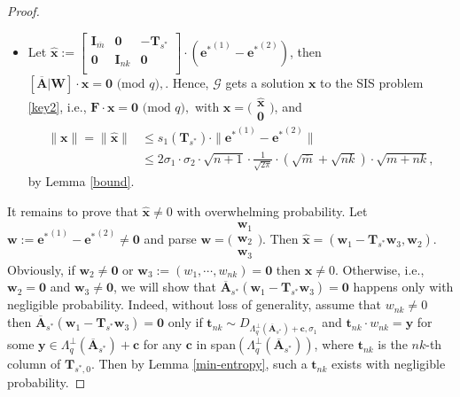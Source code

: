 \documentclass[a4paper,11pt,onecolumn]{elsarticle}
\def\bf{\mathbf}
\begin{document}
\begin{proof}
\begin{itemize}
		
	\item 
			Let $\widehat{\mathbf{x}}:=\begin{bmatrix}
				\mathbf{I}_{\overline{m}} & \textbf{0} &-\mathbf{T}_{s^*} \\
				\textbf{0}&\textbf{I}_{nk}& \textbf{0}\\
				\end{bmatrix} \cdot ({\textbf{e}^*}^{(1)}-{\textbf{e}^*}^{(2)})$,  then $[\overline{\textbf{A}}|\textbf{W}]\cdot  
					   \widehat{\mathbf{x}}
					 =\bf{0}\text{ (mod } q),$.
		Hence, $\mathcal{G}$ gets a solution $\mathbf{x}$ to the SIS problem \eqref{key2}, i.e.,  $\mathbf{F}\cdot \mathbf{x}=\bf{0}\text{ (mod } q),$ with $\mathbf{x}= \bigl( \begin{smallmatrix}
		   \widehat{\mathbf{x}}\\\mathbf{0}
		 \end{smallmatrix} \bigr)$, and 	 
	\begin{align*}
		\| \mathbf{x}\|=\| \widehat{\mathbf{x}}\| 	&\leq  s_1(\mathbf{T}_{s^*}) \cdot \| {\textbf{e}^*}^{(1)}-{\textbf{e}^*}^{(2)}\|\\
		&	\leq 2\sigma_1\cdot \sigma_2\cdot \sqrt{n+1} \cdot \frac{1}{\sqrt{2\pi}}\cdot (\sqrt{\overline{m}}+\sqrt{nk}) \cdot\sqrt{m+nk},
	\end{align*}
		 by Lemma \ref{bound}. 
		
	
		\end{itemize}
			It remains  to prove that $\widehat{\mathbf{x}}\neq 0$ with overwhelming probability. Let $\textbf{w}:={\textbf{e}^*}^{(1)}-{\textbf{e}^*}^{(2)} \neq \textbf{0}$ and parse $\mathbf{w}= \bigl( \begin{smallmatrix}
						  \mathbf{w}_1\\\mathbf{w}_2\\\textbf{w}_3
						 \end{smallmatrix} \bigr)$. Then  $\widehat{\mathbf{x}}=(\mathbf{w}_1-\textbf{T}_{s^*} \mathbf{w}_3, \mathbf{w}_2)$. Obviously, if $\mathbf{w}_2 \neq \textbf{0}$ or $\mathbf{w}_3:=(w_1, \cdots, w_{nk})=\textbf{0}$ then $\widehat{\mathbf{x}}\neq 0$. Otherwise, i.e., $\mathbf{w}_2 = \textbf{0}$ and $\mathbf{w}_3\neq \textbf{0}$,  we will show that $\overline{\textbf{A}}_{s^*}(\mathbf{w}_1-\textbf{T}_{s^*} \mathbf{w}_3)=\textbf{0}$ happens only with negligible probability. Indeed, without loss of generality, assume that  $w_{nk}\neq 0$ then $\overline{\textbf{A}}_{s^*}(\mathbf{w}_1-\textbf{T}_{s^*} \mathbf{w}_3)=\textbf{0}$ only if $\textbf{t}_{nk}\sim D_{\Lambda_q^{\bot}(\overline{\textbf{A}}_{{s^*}})+\textbf{c}, \sigma_1}$ and $\textbf{t}_{nk} \cdot w_{nk}=\textbf{y}$ for some $\textbf{y}\in \Lambda_q^{\bot}(\overline{\textbf{A}}_{{s^*}})+\textbf{c}$ for any $\textbf{c}$ in span$(\Lambda_q^{\bot}(\overline{\textbf{A}}_{{s^*}}))$, where $\textbf{t}_{nk}$ is the $nk$-th column of $\textbf{T}_{s^*,0}$. Then by Lemma  \ref{min-entropy}, such a  $\textbf{t}_{nk}$ exists with negligible probability.	
						 

\end{proof}
\end{document}

